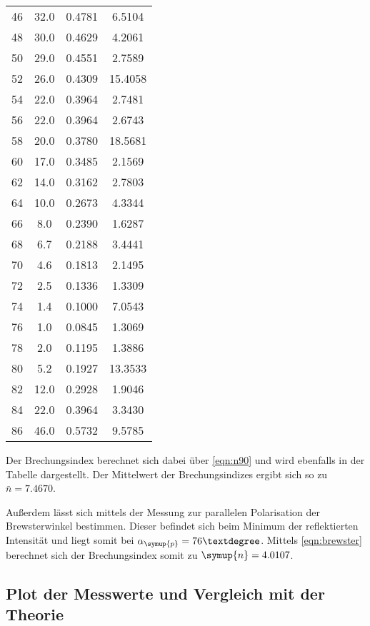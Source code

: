\begin{table}
\begin{tabular}{c c c c}
        \midrule
        46&32.0&0.4781&6.5104 \\
        48&30.0&0.4629&4.2061 \\
        50&29.0&0.4551&2.7589 \\
       52&26.0&0.4309&15.4058 \\
        54&22.0&0.3964&2.7481 \\
        56&22.0&0.3964&2.6743 \\
       58&20.0&0.3780&18.5681 \\
        60&17.0&0.3485&2.1569 \\
        62&14.0&0.3162&2.7803 \\
        64&10.0&0.2673&4.3344 \\
         66&8.0&0.2390&1.6287 \\
         68&6.7&0.2188&3.4441 \\
         70&4.6&0.1813&2.1495 \\
         72&2.5&0.1336&1.3309 \\
         74&1.4&0.1000&7.0543 \\
         76&1.0&0.0845&1.3069 \\
         78&2.0&0.1195&1.3886 \\
        80&5.2&0.1927&13.3533 \\
        82&12.0&0.2928&1.9046 \\
        84&22.0&0.3964&3.3430 \\
        86&46.0&0.5732&9.5785 \\
        \bottomrule
    \end{tabular}
    \label{tab:Pol90}
\end{table}
Der Brechungsindex berechnet sich dabei über \autoref{eqn:n90} und wird ebenfalls in der Tabelle dargestellt. 
Der Mittelwert der Brechungsindizes ergibt sich so zu $\bar{n}= 7.4670$.

Außerdem lässt sich mittels der Messung zur parallelen Polarisation der Brewsterwinkel bestimmen. Dieser befindet sich beim Minimum der 
reflektierten Intensität und liegt somit bei $\alpha_{\symup{p}} = 76°$. Mittels \autoref{eqn:brewster} berechnet sich der Brechungsindex somit zu  
$\symup{n} = 4.0107$.

\subsection{Plot der Messwerte und Vergleich mit der Theorie}

